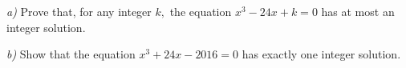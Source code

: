 \textit{a)} Prove that, for any integer $ k, $ the equation $ x^3-24x+k=0 $ has at most an integer solution.

\textit{b)} Show that the equation $ x^3+24x-2016=0 $ has exactly one integer solution.